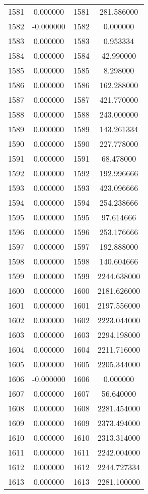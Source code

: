 \documentclass[12pt]{article}
\begin{document}
\begin{longtable}{@{}cccc@{}}
1581 & 0.000000 & 1581 & 281.586000 \\
1582 & -0.000000 & 1582 & 0.000000 \\
1583 & 0.000000 & 1583 & 0.953334 \\
1584 & 0.000000 & 1584 & 42.990000 \\
1585 & 0.000000 & 1585 & 8.298000 \\
1586 & 0.000000 & 1586 & 162.288000 \\
1587 & 0.000000 & 1587 & 421.770000 \\
1588 & 0.000000 & 1588 & 243.000000 \\
1589 & 0.000000 & 1589 & 143.261334 \\
1590 & 0.000000 & 1590 & 227.778000 \\
1591 & 0.000000 & 1591 & 68.478000 \\
1592 & 0.000000 & 1592 & 192.996666 \\
1593 & 0.000000 & 1593 & 423.096666 \\
1594 & 0.000000 & 1594 & 254.238666 \\
1595 & 0.000000 & 1595 & 97.614666 \\
1596 & 0.000000 & 1596 & 253.176666 \\
1597 & 0.000000 & 1597 & 192.888000 \\
1598 & 0.000000 & 1598 & 140.604666 \\
1599 & 0.000000 & 1599 & 2244.638000 \\
1600 & 0.000000 & 1600 & 2181.626000 \\
1601 & 0.000000 & 1601 & 2197.556000 \\
1602 & 0.000000 & 1602 & 2223.044000 \\
1603 & 0.000000 & 1603 & 2294.198000 \\
1604 & 0.000000 & 1604 & 2211.716000 \\
1605 & 0.000000 & 1605 & 2205.344000 \\
1606 & -0.000000 & 1606 & 0.000000 \\
1607 & 0.000000 & 1607 & 56.640000 \\
1608 & 0.000000 & 1608 & 2281.454000 \\
1609 & 0.000000 & 1609 & 2373.494000 \\
1610 & 0.000000 & 1610 & 2313.314000 \\
1611 & 0.000000 & 1611 & 2242.004000 \\
1612 & 0.000000 & 1612 & 2244.727334 \\
1613 & 0.000000 & 1613 & 2281.100000 \\

\end{longtable}
\end{document}
